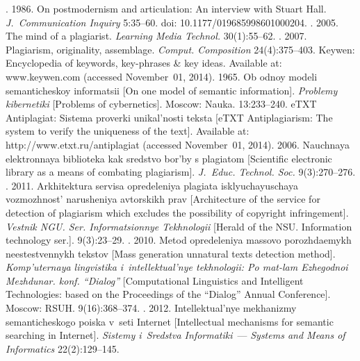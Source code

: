 \begin{multicols}{2}
{{\begin{thebibliography}{99}
. 1986. On postmodernism and articulation: An
interview with Stuart Hall. \textit{J.~Communication Inquiry} 5:35--60. doi:
10.1177/019685998601000204.
. 2005. The mind of a plagiarist.
\textit{Learning Media Technol.} 30(1):55--62.
. 2007. Plagiarism, originality,
assemblage. \textit{Comput. Composition} 24(4):375--403.
Keywen: Encyclopedia of keywords, key-phrases \& key ideas. Available at: {\sf
www.keywen.com} (accessed November~01, 2014).
 1965. Ob odnoy modeli semanticheskoy informatsii [On one
model of semantic information]. \textit{Problemy kibernetiki} [Problems of
cybernetics]. Moscow: Nauka.  13:233--240.
eTXT Antiplagiat: Sistema proverki unikal'nosti teksta [eTXT Antiplagiarism: The
system to verify the uniqueness of the text]. Available at: {\sf
http://www.etxt.ru/antiplagiat} (accessed November~01, 2014).
 2006.  Nauchnaya elektronnaya biblioteka kak sredstvo bor'by s
plagiatom [Scientific electronic library as a means of combating plagiarism].
\textit{J.~Educ. Technol. Soc.} 9(3):270--276.
. 2011. Arkhitektura
servisa opredeleniya plagiata isklyuchayuschaya vozmozhnost' narusheniya
avtorskikh prav [Architecture of the service for detection of plagiarism which
excludes the possibility of copyright infringement]. \textit{Vestnik NGU. Ser.
Informatsionnye Tekhnologii} [Herald of the NSU. Information
technology ser.]. 9(3):23--29.
. 2010. Metod opredeleniya massovo
porozhdaemykh neestestvennykh tekstov [Mass generation unnatural texts
detection method]. \textit{Komp'uternaya lingvistika i~intellektual'nye
tekhnologii: Po mat-lam Ezhegodnoi Mezhdunar. konf. ``Dialog''}
[Computational Linguistics and Intelligent Technologies:
based on the Proceedings of the ``Dialog'' Annual Conference]. Moscow: RSUH. 9(16):368--374.
. 2012.
Intellektual'nye mekhanizmy semanticheskogo poiska v~seti Internet [Intellectual
mechanisms for semantic searching in Internet]. \textit{Sistemy i~Sredstva
Informatiki}~--- \textit{Systems and Means of Informatics} 22(2):129--145.

\end{thebibliography}

 }
 }

\end{multicols}

